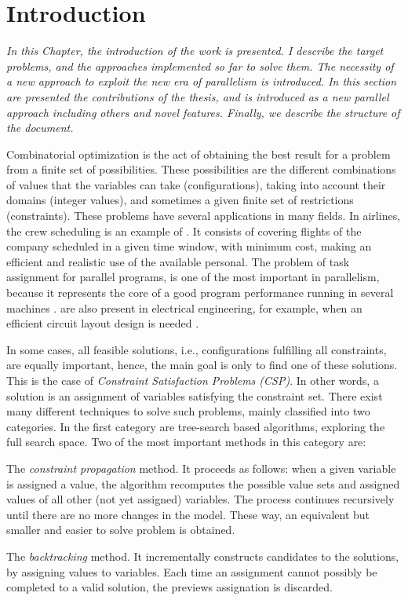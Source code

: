 \chapter{Introduction}
\label{chap:Intro}
\textit{In this Chapter, the introduction of the work is presented. I describe the target problems, and the approaches implemented so far to solve them. The necessity of a new approach to exploit the new era of parallelism is introduced.
In this section are presented the contributions of the thesis, and \posl{} is introduced as a new parallel approach including others and novel features. Finally, we describe the structure of the document.}
\vfill
\minitoc
\newpage

Combinatorial optimization is the act of obtaining the best result for a problem from a finite set of possibilities. These possibilities are the different combinations of values that the variables can take (configurations), taking into account their domains (integer values), and sometimes a given finite set of restrictions (constraints). These problems have several applications in many fields. In airlines, the crew scheduling is an example of \COP. It consists of covering flights of the company scheduled in a given time window, with minimum cost, making an efficient and realistic use of the available personal. The problem of task assignment for parallel programs, is one of the most important in parallelism, because it represents the core of a good program performance running in several machines \cite{Paschos2013}. %
\COPs{} are also present in electrical engineering, for example, when an efficient circuit layout design is needed \cite{Barahona1988}. 

In some cases, all feasible solutions, i.e., configurations fulfilling all constraints, are equally important, hence, the main goal is only to find  one of these solutions. This is the case of {\it Constraint Satisfaction Problems (CSP)}. In other words, a solution is an assignment of variables satisfying the constraint set. There exist many different techniques to solve such problems, mainly classified into two categories. In the first category are tree-search based algorithms, exploring the full search space. Two of the most important methods in this category are: \begin{inparaenum}[a)] \item The \textit{constraint propagation} method. It proceeds as follows: when a given variable is assigned a value, the algorithm recomputes the possible value sets and assigned values of all other (not yet assigned) variables. The process continues recursively until there are no more changes in the model. These way, an equivalent but smaller and easier to solve problem is obtained. \item The \textit{backtracking} method. It incrementally constructs candidates to the solutions, by assigning values to variables. Each time an assignment cannot possibly be completed to a valid solution, the previews assignation is discarded. \end{inparaenum} 


